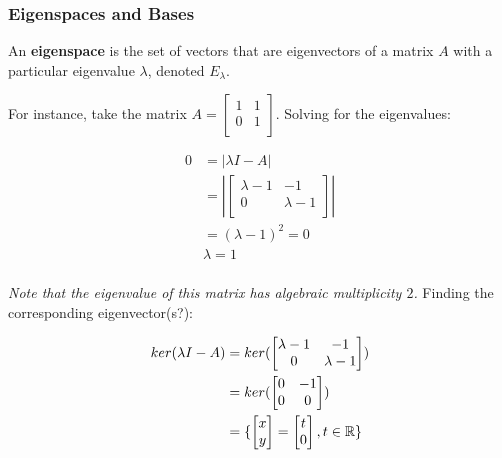 \documentclass[12pt]{article}
\begin{document}
{{\subsubsection{Eigenspaces and Bases}

An \textbf{eigenspace} is the set of vectors that are eigenvectors of a matrix $A$ with a particular eigenvalue $\lambda$, denoted $E_{\lambda}$. 

For instance, take the matrix $A = \begin{bmatrix}
    1 & 1\\
    0 & 1\\
\end{bmatrix}$. Solving for the eigenvalues:

\begin{align*}
    0 &= |\lambda I - A|\\
    &= |\begin{bmatrix}
        \lambda-1 & -1\\
        0 & \lambda-1\\
    \end{bmatrix}|\\
    &= (\lambda-1)^2 = 0\\
    &\lambda = 1\\
\end{align*}

\textit{Note that the eigenvalue of this matrix has algebraic multiplicity $2$.} Finding the corresponding eigenvector(s?):

\begin{align*}
    ker(\lambda I - A) &= ker(\begin{bmatrix}
        \lambda - 1 & -1\\
        0 & \lambda-1\\
    \end{bmatrix})\\
    &= ker(\begin{bmatrix}
        0 & -1\\
        0 & 0\\
    \end{bmatrix})\\
    &= \{\begin{bmatrix}
        x\\
        y
    \end{bmatrix} = \begin{bmatrix}
        t\\
        0
    \end{bmatrix}, t \in \mathbb{R} \}
\end{align*}

}}
\end{document}
